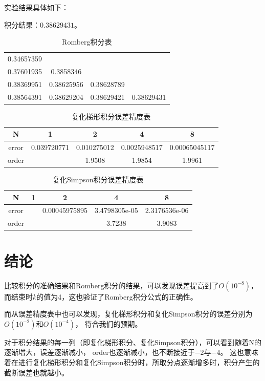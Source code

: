 \documentclass{article}
\begin{document}
实验结果具体如下：

积分结果：$0.38629431$。

\begin{table}[H]
    \centering
    \caption{Romberg积分表}
    \begin{tabular}{cccc}
        \hline
        0.34657359 & ~ & ~ & ~ \\
        0.37601935 & 0.3858346 & ~ & ~ \\
        0.38369951 & 0.38625956 & 0.38628789 & ~ \\
        0.38564391 & 0.38629204 & 0.38629421 & 0.38629431 \\
        \hline
    \end{tabular}
\end{table}

\begin{table}[H]
    \centering
    \caption{复化梯形积分误差精度表}
    \begin{tabular}{|c|c|c|c|c|}
        \hline
        N & 1 & 2 & 4 & 8 \\
        \hline
        error & 0.039720771 & 0.010275012 & 0.0025948517 & 0.00065045117 \\
        \hline
        order & ~ & 1.9508 & 1.9854 & 1.9961 \\
        \hline
    \end{tabular}
\end{table}

\begin{table}[H]
    \centering
    \caption{复化Simpson积分误差精度表}
    \begin{tabular}{|c|c|c|c|c|}
        \hline
        N & 1 & 2 & 4 & 8 \\
        \hline
        error & ~ & 0.00045975895 & 3.4798305e-05 & 2.3176536e-06 \\
        \hline
        order & ~ & ~ & 3.7238 & 3.9083 \\
        \hline
    \end{tabular}
\end{table}

\section{结论}

比较积分的准确结果和Romberg积分的结果，可以发现误差提高到了$O(10^{-8})$，
而结束时$k$的值为4，这也验证了Romberg积分公式的正确性。

而从误差精度表中也可以发现，复化梯形积分和复化Simpson积分的误差分别为$O(10^{-2})$和$O(10^{-4})$，
符合我们的预期。

对于积分结果的每一列（即复化梯形积分、复化Simpson积分），可以看到随着N的逐渐增大，误差逐渐减小，
order也逐渐减小，也不断接近于$-2$与$-4$。
这也意味着在进行复化梯形积分和复化Simpson积分时，所取分点逐渐增多时，积分产生的截断误差也就越小。
\end{document}
